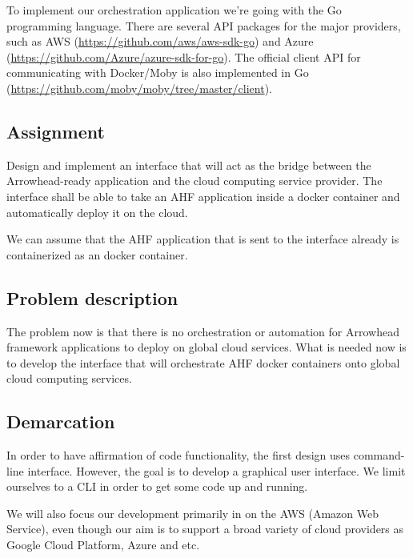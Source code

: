 \documentclass[a4paper,15pt,twoside]{article}
\begin{document}
To implement our orchestration application we're going with the Go programming language. There are several API packages for the major providers, such as AWS (\url{https://github.com/aws/aws-sdk-go}) and Azure (\url{https://github.com/Azure/azure-sdk-for-go}). The official client API for communicating with Docker/Moby is also implemented in Go (\url{https://github.com/moby/moby/tree/master/client}).

\subsection{Assignment}
Design and implement an interface that will act as the bridge between the Arrowhead-ready application and the cloud computing service provider. The interface shall be able to take an AHF application inside a docker container and automatically deploy it on the cloud.

We can assume that the AHF application that is sent to the interface already is containerized as an docker container. 

\subsection{Problem description}
The problem now is that there is no orchestration or automation for Arrowhead framework applications to deploy on global cloud services. What is needed now is to develop the interface that will orchestrate AHF docker containers onto global cloud computing services. 

\subsection{Demarcation}
In order to have affirmation of code functionality, the first design uses command-line interface. However, the goal is to develop a graphical user interface. We limit ourselves to a CLI in order to get some code up and running. 

We will also focus our development primarily in on the AWS (Amazon Web Service), even though our aim is to support a broad variety of cloud providers as Google Cloud Platform, Azure and etc. 
\end{document}
